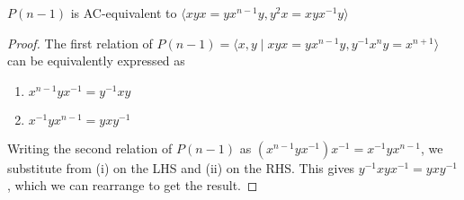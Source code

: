 \begin{lemma}
    $P(n-1)$ is AC-equivalent to $\langle xyx=yx^{n-1}y, y^2x=xyx^{-1}y \rangle$
\end{lemma}

\begin{proof}
    The first relation of $P(n-1)=\langle x,y \mid xyx=yx^{n-1} y, y^{-1}x^n y = x^{n+1}\rangle$ can be equivalently expressed as
    \begin{enumerate}[label=(\roman*)]
        \item $x^{n-1}yx^{-1}=y^{-1}xy$
        \item $x^{-1}yx^{n-1}=yxy^{-1}$
    \end{enumerate}
    Writing the second relation of $P(n-1)$ as  $(x^{n-1}yx^{-1})x^{-1}=x^{-1}yx^{n-1}$, we substitute from (i) on the LHS and (ii) on the RHS. This gives $y^{-1}xyx^{-1}=yxy^{-1}$, which we can rearrange to get the result.
\end{proof}

